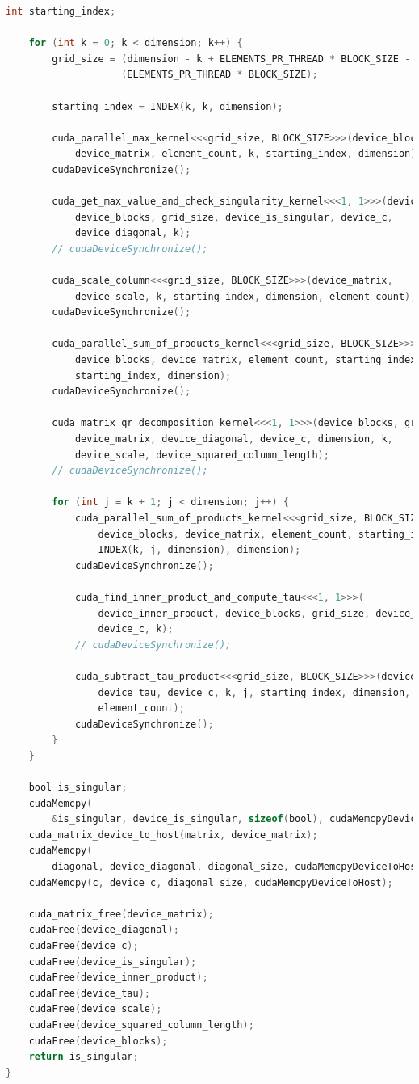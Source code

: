 \begin{lstlisting}[language=C, caption={QR Decomposition GPU Parallel Max Implementation}, label={lst:qr_gpu_parallel_max}]
    int starting_index;

    for (int k = 0; k < dimension; k++) {
        grid_size = (dimension - k + ELEMENTS_PR_THREAD * BLOCK_SIZE - 1) /
                    (ELEMENTS_PR_THREAD * BLOCK_SIZE);

        starting_index = INDEX(k, k, dimension);

        cuda_parallel_max_kernel<<<grid_size, BLOCK_SIZE>>>(device_blocks,
            device_matrix, element_count, k, starting_index, dimension);
        cudaDeviceSynchronize();

        cuda_get_max_value_and_check_singularity_kernel<<<1, 1>>>(device_scale,
            device_blocks, grid_size, device_is_singular, device_c,
            device_diagonal, k);
        // cudaDeviceSynchronize();

        cuda_scale_column<<<grid_size, BLOCK_SIZE>>>(device_matrix,
            device_scale, k, starting_index, dimension, element_count);
        cudaDeviceSynchronize();

        cuda_parallel_sum_of_products_kernel<<<grid_size, BLOCK_SIZE>>>(
            device_blocks, device_matrix, element_count, starting_index,
            starting_index, dimension);
        cudaDeviceSynchronize();

        cuda_matrix_qr_decomposition_kernel<<<1, 1>>>(device_blocks, grid_size,
            device_matrix, device_diagonal, device_c, dimension, k,
            device_scale, device_squared_column_length);
        // cudaDeviceSynchronize();

        for (int j = k + 1; j < dimension; j++) {
            cuda_parallel_sum_of_products_kernel<<<grid_size, BLOCK_SIZE>>>(
                device_blocks, device_matrix, element_count, starting_index,
                INDEX(k, j, dimension), dimension);
            cudaDeviceSynchronize();

            cuda_find_inner_product_and_compute_tau<<<1, 1>>>(
                device_inner_product, device_blocks, grid_size, device_tau,
                device_c, k);
            // cudaDeviceSynchronize();

            cuda_subtract_tau_product<<<grid_size, BLOCK_SIZE>>>(device_matrix,
                device_tau, device_c, k, j, starting_index, dimension,
                element_count);
            cudaDeviceSynchronize();
        }
    }

    bool is_singular;
    cudaMemcpy(
        &is_singular, device_is_singular, sizeof(bool), cudaMemcpyDeviceToHost);
    cuda_matrix_device_to_host(matrix, device_matrix);
    cudaMemcpy(
        diagonal, device_diagonal, diagonal_size, cudaMemcpyDeviceToHost);
    cudaMemcpy(c, device_c, diagonal_size, cudaMemcpyDeviceToHost);

    cuda_matrix_free(device_matrix);
    cudaFree(device_diagonal);
    cudaFree(device_c);
    cudaFree(device_is_singular);
    cudaFree(device_inner_product);
    cudaFree(device_tau);
    cudaFree(device_scale);
    cudaFree(device_squared_column_length);
    cudaFree(device_blocks);
    return is_singular;
}
\end{lstlisting}

